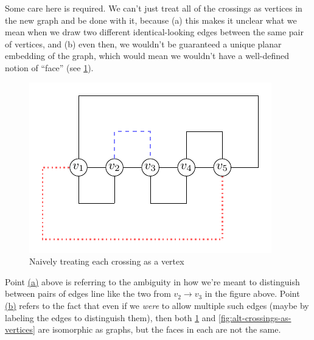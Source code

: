 Some care here is required. We can't just treat all of the crossings
as vertices in the new graph and be done with it, because
\hypertarget{planar-point-a}{(a)} this makes it unclear what we mean
when we draw two different identical-looking edges between the same
pair of vertices, and \hypertarget{planar-point-b}{(b)} even then, we
wouldn't be guaranteed a unique planar embedding of the graph, which
would mean we wouldn't have a well-defined notion of ``face'' (see
\cref{fig:crossings-as-vertices}).
\begin{figure}[H]
  \centering
  \includegraphics[scale=.75]{figures/unknotting-moves-and-combinatorial-representations/5-1-planar-graph.pdf}
  \caption[Planar graph]{Naively treating each crossing as a vertex}
  \label{fig:crossings-as-vertices}
\end{figure}
Point \hyperlink{planar-point-a}{(a)} above is referring to the
ambiguity in how we're meant to distinguish between pairs of edges
line like the two from $v_2 \to v_3$ in the figure above. Point
\hyperlink{planar-point-b}{(b)} refers to the fact that even if we
\emph{were} to allow multiple such edges (maybe by labeling the edges
to distinguish them), then both \cref{fig:crossings-as-vertices} and
\cref{fig:alt-crossings-as-vertices} are isomorphic as graphs, but the
faces in each are not the same.
